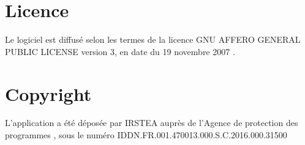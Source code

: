 \section{Licence}
Le logiciel est diffusé selon les termes de la licence GNU AFFERO GENERAL PUBLIC LICENSE version 3, en date du 19 novembre 2007 \cite{agpl}.

\section{Copyright}

L'application a été déposée par IRSTEA auprès de l'Agence de protection des programmes \cite{app}, sous le numéro IDDN.FR.001.470013.000.S.C.2016.000.31500
